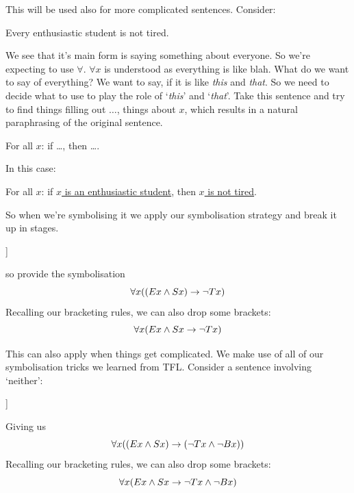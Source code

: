 This will be used also for more complicated sentences. 
Consider:
\begin{samplesent}
	\item Every enthusiastic student is not tired. 
\end{samplesent}
We see that it's main form is saying something about everyone. So we're expecting to use $\forall$. $\forall x$ is understood as everything is like blah. What do we want to say of everything? We want to say, if it is like \emph{this} and \emph{that}. So we need to decide what to use to play the role of `\emph{this}' and `\emph{that}'. 
Take this sentence and try to find things filling out $\ldots$, things about $x$, which results in a natural paraphrasing of the original sentence. 
\begin{samplesent}
	\item[] For all $x$: if \ldots, then \ldots. 
\end{samplesent}
In this case: 
\begin{samplesent}
\item[]	For all $x$: if \underline{$x$ is an enthusiastic student}, then \underline{$x$ is not tired}. 
\end{samplesent}
So when we're symbolising it we apply our symbolisation strategy and break it up in stages.
\begin{center}
	\begin{forest}
		[Every enthusiastic student is not tired\\
		For all $x$: if \ldots then \ldots\\
		$\forall x(\ldots\eif\ldots)$
		[$x$ is an enthusiastic student\\$\almostinvisibleopenbracket Ex\eand Sx\almostinvisibleclosebracket$]
		[$x$ is not tired\\$\enot Tx$]
		]
	\end{forest}
\end{center}
so provide the symbolisation $$\forall x((Ex\mathbin{\wedge} Sx)\rightarrow\neg Tx)$$
Recalling our bracketing rules, we can also drop some brackets:
$$\forall x(Ex\mathbin{\wedge} Sx\rightarrow \neg Tx)$$

This can also apply when things get complicated. We make use of all of our symbolisation tricks we learned from TFL. Consider a sentence involving `neither':
\begin{center}
	\begin{forest}
		[All enthusiastic students are neither tired nor bored\\
		For all $x$: if \ldots then \ldots\\
		$\forall x(\ldots\eif\ldots)$
		[$x$ is an enthusiastic student\\$\almostinvisibleopenbracket Ex\eand Sx\almostinvisibleclosebracket$]
		[$x$ is neither tired nor bored\\$\enot Tx\eand\enot Bx$\\\emph{or: $\enot(Tx\eor Bx)$}]
		]
	\end{forest}
\end{center}
Giving us $$\forall x((Ex\mathbin{\wedge} Sx)\rightarrow (\neg Tx\mathbin{\wedge}\neg Bx))$$
Recalling our bracketing rules, we can also drop some brackets:
$$\forall x(Ex\mathbin{\wedge} Sx\rightarrow \neg Tx\mathbin{\wedge}\neg Bx)$$


